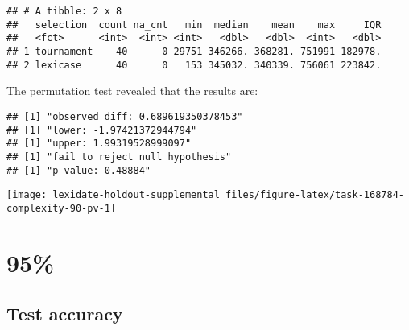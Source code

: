 \documentclass[
]{book}
\newenvironment{Shaded}{\begin{snugshade}}{\end{snugshade}}
\newcommand{\AttributeTok}[1]{\textcolor[rgb]{0.13,0.29,0.53}{#1}}
\newcommand{\DecValTok}[1]{\textcolor[rgb]{0.00,0.00,0.81}{#1}}
\newcommand{\FunctionTok}[1]{\textcolor[rgb]{0.13,0.29,0.53}{\textbf{#1}}}
\newcommand{\NormalTok}[1]{#1}
\newcommand{\OtherTok}[1]{\textcolor[rgb]{0.56,0.35,0.01}{#1}}
\newcommand{\SpecialCharTok}[1]{\textcolor[rgb]{0.81,0.36,0.00}{\textbf{#1}}}
\newcommand{\StringTok}[1]{\textcolor[rgb]{0.31,0.60,0.02}{#1}}
\begin{document}
\begin{verbatim}
## # A tibble: 2 x 8
##   selection  count na_cnt   min  median    mean    max     IQR
##   <fct>      <int>  <int> <int>   <dbl>   <dbl>  <int>   <dbl>
## 1 tournament    40      0 29751 346266. 368281. 751991 182978.
## 2 lexicase      40      0   153 345032. 340339. 756061 223842.
\end{verbatim}

The permutation test revealed that the results are:

\begin{Shaded}
\end{Shaded}

\begin{verbatim}
## [1] "observed_diff: 0.689619350378453"
## [1] "lower: -1.97421372944794"
## [1] "upper: 1.99319528999097"
## [1] "fail to reject null hypothesis"
## [1] "p-value: 0.48884"
\end{verbatim}

\texttt{[image: lexidate-holdout-supplemental\_files/figure-latex/task-168784-complexity-90-pv-1]}

\hypertarget{section-54}{%
\section{95\%}\label{section-54}}

\hypertarget{test-accuracy-54}{%
\subsection{Test accuracy}\label{test-accuracy-54}}
\end{document}
